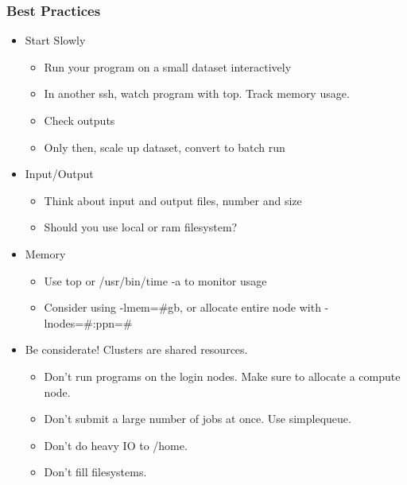 \documentclass[10pt]{beamer}
\begin{document}
\begin{frame}[fragile]
\frametitle{Best Practices}

\begin{itemize}
\item Start Slowly
\begin{itemize}
\item Run your program on a small dataset interactively
\item In another ssh, watch program with top.  Track memory usage.
\item Check outputs
\item Only then, scale up dataset, convert to batch run
\end{itemize}
\item Input/Output
\begin{itemize}
\item Think about input and output files, number and size
\item Should you use local or ram filesystem? 
\end{itemize}
\item Memory

\begin{itemize}
\item Use top or /usr/bin/time -a to monitor usage
\item Consider using -lmem=\#gb, or allocate entire node with -lnodes=\#:ppn=\#
\end{itemize}

\item Be considerate!  Clusters are shared resources.

\begin{itemize}
\item Don't run programs on the login nodes.  Make sure to allocate a compute node.
\item Don't submit a large number of jobs at once.  Use simplequeue.
\item Don't do heavy IO to /home.
\item Don't fill filesystems.
\end{itemize}
\end{itemize}

\end{frame}
\end{document}
